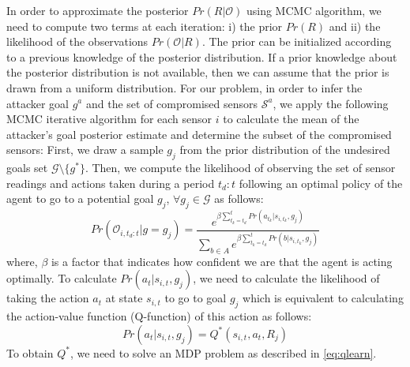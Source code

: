 \documentclass[letterpaper, 10 pt, conference]{ieeeconf}  %
\newcommand\NB[1]{$\spadesuit$\footnote{NB: #1}}
\begin{document}
In order to approximate the posterior $Pr(R|\mathcal{O})$ using MCMC algorithm, we need to compute two terms at each iteration: i) the prior $Pr(R)$ and ii) the likelihood of the observations $Pr(\mathcal{O}|R)$.
The prior can be initialized according to a previous knowledge of the posterior distribution. If a prior knowledge about the posterior distribution is not available, then we can assume that the prior is drawn from a uniform distribution.
For our problem, in order to infer the attacker goal $g^a$ and the set of compromised sensors $\mathcal{S}^a$, we apply the following MCMC iterative algorithm for each sensor $i$ to calculate the mean of the attacker's goal posterior estimate and determine the subset of the compromised sensors: %
First, we draw a sample $g_j$ from the prior distribution of the undesired goals set $\mathcal{G} \setminus \{g^*\}$. Then, we compute the likelihood of observing the set of sensor readings and actions taken during a period $t_d:t$ following an optimal policy of the agent to go to a potential goal $g_j$, $\forall g_j \in \mathcal G$ as follows:
\begin{equation}\label{eq:likelihood}
Pr(\mathcal{O}_{i,t_d:t} | g = g_j)  = \frac{e^{\beta\sum_{t_k = t_d}^{t}{ Pr(a_{t_k}|s_{i,t_k},g_j)}}}{\sum_{b\in A}{}e^{\beta\sum_{t_k=t_d}^{t} Pr(b|s_{i,t_k},g_j)}}
\end{equation}
where, $\beta$ is a factor that indicates how confident we are that the agent is acting optimally. To calculate $Pr(a_t|s_{i,t},g_j)$,  we need to calculate the likelihood of taking the action $a_t$ at state $s_{i,t}$ to go to goal $g_j$ which is equivalent to calculating the action-value function (Q-function) of this action as follows:
\begin{equation} Pr(a_t|s_{i,t},g_j) = Q^*(s_{i,t},a_t,R_j)
\label{eqn:action_likelihood}
\end{equation}
To obtain $Q^*$, we need to solve an MDP problem as described in \eqref{eq:qlearn}.%




%
\end{document}
